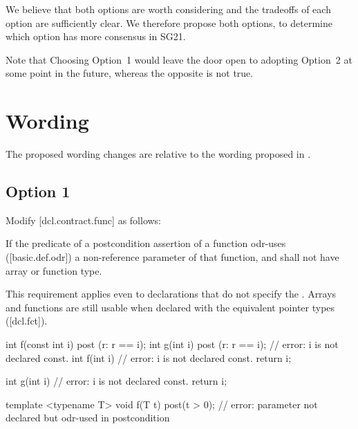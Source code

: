 We believe that both options are worth considering and the tradeoffs of each option are sufficiently clear. We therefore propose both options, to determine which option has more consensus in SG21. 

Note that Choosing Option~1 would leave the door open to adopting Option~2 at some point in the future, whereas the opposite is not true.

\section{Wording}

The proposed wording changes are relative to the wording proposed in \cite{P2900R10}.

\subsection{Option 1}

Modify [dcl.contract.func] as follows:

\begin{adjustwidth}{0.5cm}{0.5cm}
If the predicate of a postcondition assertion of a function odr-uses ([basic.def.odr]) a
non-reference parameter of that function, and
shall not have array or function type.
\begin{note}
This requirement applies even to declarations that do not specify the . Arrays and functions are still usable when
declared with the equivalent pointer types ([dcl.fct]). 
\end{note}
\begin{example}
\begin{codeblock}
int f(const int i)
post (r: r == i);
int g(int i)
post (r: r == i); // error: i is not declared const.
int f(int i) // error: i is not declared const.
{
  return i;
}

int g(int i) // error: i is not declared const.
{
  return i;
}
\end{codeblock}
\begin{addedblock}
\begin{codeblock}
template <typename T>
void f(T t) post(t > 0);  // error: parameter not declared  but odr-used in postcondition 
\end{codeblock}
\end{addedblock}
\end{example}
\end{adjustwidth}

